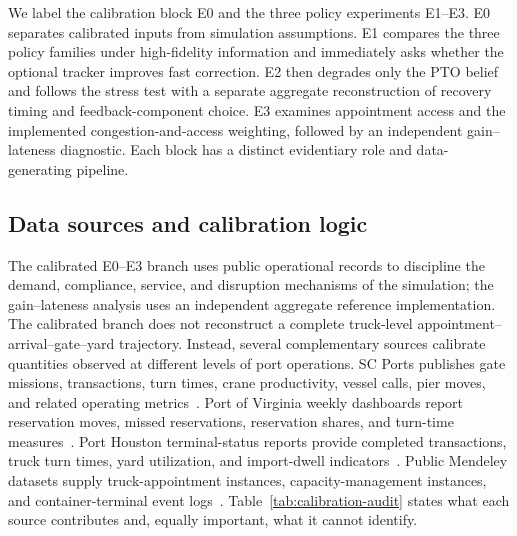 \documentclass[preprint,12pt,authoryear,a4paper]{elsarticle}
\begin{document}
We label the calibration block E0 and the three policy experiments E1--E3. E0 separates calibrated inputs from simulation assumptions. E1 compares the three policy families under high-fidelity information and immediately asks whether the optional tracker improves fast correction. E2 then degrades only the PTO belief and follows the stress test with a separate aggregate reconstruction of recovery timing and feedback-component choice. E3 examines appointment access and the implemented congestion-and-access weighting, followed by an independent gain--lateness diagnostic. Each block has a distinct evidentiary role and data-generating pipeline.

\subsection{Data sources and calibration logic}
\label{subsec:6-1-data-sources-and-calibration-logic}

The calibrated E0--E3 branch uses public operational records to discipline the demand, compliance, service, and disruption mechanisms of the simulation; the gain--lateness analysis uses an independent aggregate reference implementation. The calibrated branch does not reconstruct a complete truck-level appointment--arrival--gate--yard trajectory. Instead, several complementary sources calibrate quantities observed at different levels of port operations. SC Ports publishes gate missions, transactions, turn times, crane productivity, vessel calls, pier moves, and related operating metrics~\citep{SCPortsMetrics2026}. Port of Virginia weekly dashboards report reservation moves, missed reservations, reservation shares, and turn-time measures~\citep{PortVirginiaStatistics2026}. Port Houston terminal-status reports provide completed transactions, truck turn times, yard utilization, and import-dwell indicators~\citep{PortHoustonStatus2026}. Public Mendeley datasets supply truck-appointment instances, capacity-management instances, and container-terminal event logs~\citep{HuynhEtAl2018TASData,MarOrtiz2020CapacityData,PrasetyoEtAl2023EventLog}. Table~\ref{tab:calibration-audit} states what each source contributes and, equally important, what it cannot identify.
\end{document}
